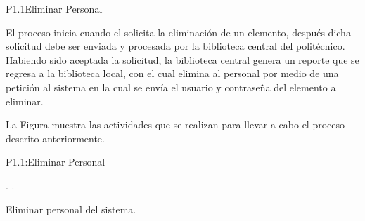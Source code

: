 
\begin{Proceso}{P1.1}{Eliminar Personal} {
  
    \bigskip El proceso inicia cuando el  solicita la eliminación de un elemento, después dicha solicitud debe ser enviada y procesada por la biblioteca central del politécnico. Habiendo sido aceptada la solicitud, la biblioteca central genera un reporte que se regresa a la biblioteca local, con el cual elimina al personal por medio de una petición al sistema en la cual se envía el usuario y contraseña del elemento a eliminar.
  
    

    \noindent La Figura  muestra las actividades que se realizan para llevar a cabo el proceso descrito anteriormente.

    }{P1.1:Eliminar Personal}


     { %
        .
        .
    }

     { %
        Eliminar personal del sistema.
    }

  



\end{Proceso}
